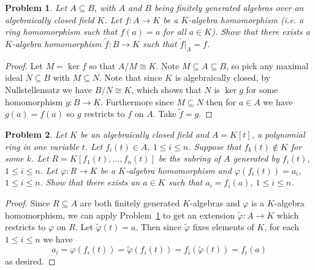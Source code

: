 \documentclass{article}
\newtheorem{problem}{Problem}
\begin{document}
\begin{problem}
\label{extension}
Let $A \subseteq B$, with $A$ and $B$ being finitely generated algebras over an algebraically closed field $K$. Let $f : A \to K$ be a $K$-algebra homomorphism (i.e. a ring homomorphism such that $f(a) = a$ for all $a \in K$). Show that there exists a $K$-algebra homomorphism $\tilde{f} : B \to K$ such that $\tilde{f} |_A = f$.
\end{problem}
\begin{proof}
Let $M = \ker f$ so that $A/M \cong K$. Note $M \subseteq A \subseteq B$, so pick any maximal ideal $N \subseteq B$ with $M \subseteq N$. Note that since $K$ is algebraically closed, by Nullstellensatz we have $B/N \cong K$, which shows that $N$ is $\ker g$ for some homomorphism $g : B \to K$. Furthermore since $M \subseteq N$ then for $a \in A$ we have $g(a) = f(a)$ so $g$ restricts to $f$ on $A$. Take $\tilde{f} = g$.
\end{proof}

\begin{problem}
\label{eval}
Let $K$ be an algebraically closed field and $A = K[t]$, a polynomial ring in one variable $t$. Let $f_i(t) \in A$, $1 \leq i \leq n$. Suppose that $f_k(t) \notin K$ for some $k$. Let $R = K[f_1(t), \dots , f_n(t)]$ be the subring of $A$ generated by $f_i(t)$, $1 \leq i \leq n$. Let $\varphi : R \to K$ be a $K$-algebra homomorphism and $\varphi(f_i(t)) = a_i$, $1 \leq i \leq n$. Show that there exists an $a \in K$ such that $a_i = f_i(a)$, $1 \leq i \leq n$.
\end{problem}
\begin{proof}
Since $R \subseteq A$ are both finitely generated $K$-algebras and $\varphi$ is a $K$-algebra homomorphism, we can apply Problem~\ref{extension} to get an extension $\tilde{\varphi} : A \to K$ which restricts to $\varphi$ on $R$. Let $\tilde{\varphi}(t) = a$. Then since $\tilde{\varphi}$ fixes elements of $K$, for each $1 \leq i \leq n$ we have
\[
a_i = \varphi(f_i(t)) = \tilde{\varphi}(f_i(t)) = f_i(\tilde{\varphi}(t)) = f_i(a)
\]
as desired.
\end{proof}
\end{document}

